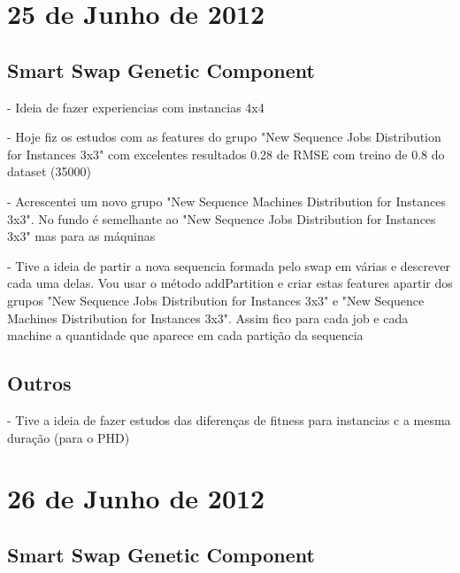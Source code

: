 \documentclass[a4paper,10pt]{article}
\title{}
\author{}
\begin{document}
\maketitle

\begin{abstract}

\end{abstract}

\section{25 de Junho de 2012}

\subsection{Smart Swap Genetic Component}

- Ideia de fazer experiencias com instancias 4x4

- Hoje fiz os estudos com as features do grupo "New Sequence Jobs Distribution for Instances 3x3" com excelentes resultados 0.28 de RMSE com treino de 0.8 do dataset (35000)  

- Acrescentei um novo grupo "New Sequence Machines Distribution for Instances 3x3". No fundo é semelhante ao "New Sequence Jobs Distribution for Instances 3x3" mas para as máquinas

- Tive a ideia de partir a nova sequencia formada pelo swap em várias e descrever cada uma delas. Vou usar o método addPartition e criar estas features apartir dos grupos "New Sequence Jobs Distribution for Instances 3x3" e "New Sequence Machines Distribution for Instances 3x3". Assim fico para cada job e cada machine a quantidade que aparece em cada partição da sequencia


\subsection{Outros}
- Tive a ideia de fazer estudos das diferenças de fitness para instancias c a mesma duração (para o PHD)

\section{26 de Junho de 2012}

\subsection{Smart Swap Genetic Component}
\end{document}
